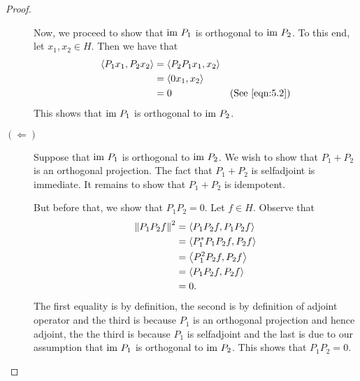 \begin{proof}
\begin{description}
	    Now, we proceed to show that ${\text{im }} P_{1}$ is orthogonal to ${\text{im }} P_{2}$. To this end, let $x_{1}, x_{2} \in H$. Then we have that
	    \begin{align*}
		\left\langle P_{1}x_{1}, P_{2}x_{2} \right\rangle &= \left\langle P_{2}P_{1}x_{1},x_{2} \right\rangle\\
		&= \left\langle 0x_{1},x_{2} \right\rangle \\
		&= 0 & (\text{See } \ref{eqn:5.2})
	    \end{align*}
	    This shows that ${\text{im }} P_{1}$ is orthogonal to ${\text{im }} P_{2}$.

	\item[$\left( \Longleftarrow \right)$] Suppose that ${\text{im }} P_{1}$ is orthogonal to ${\text{im }} P_{2}$. We wish to show that $P_{1} + P_{2}$ is an orthogonal projection. The fact that $P_{1} + P_{2}$ is selfadjoint is immediate. It remains to show that $P_{1} + P_{2}$ is idempotent.

	    But before that, we show that $P_{1}P_{2}=0$. Let $f\in H$. Observe that
	    \begin{align*}
		\left\lVert P_{1}P_{2}f \right\rVert^{2} &= \left\langle P_{1}P_{2}f, P_{1}P_{2}f \right\rangle \\
		&= \left\langle P_{1}^{*}P_{1}P_{2}f, P_{2}f \right\rangle \\
		&= \left\langle P_{1}^{2}P_{2}f, P_{2}f \right\rangle \\
		&= \left\langle P_{1}P_{2}f, P_{2}f \right\rangle \\
		&= 0.
	    \end{align*}
	    The first equality is by definition, the second is by definition of adjoint operator and the third is because $P_{1}$ is an orthogonal projection and hence adjoint, the the third is because $P_{1}$ is selfadjoint and the last is due to our assumption that ${\text{im }} P_{1}$ is orthogonal to ${\text{im }} P_{2}$. This shows that $P_{1}P_{2} = 0$.


\end{description}
\end{proof}
